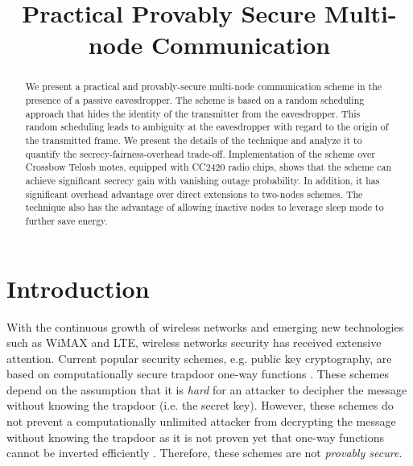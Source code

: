 \documentclass[10pt,letterpaper,conference]{IEEEtran}
\begin{document}
\title{Practical Provably Secure Multi-node Communication}

\author{
 \and
{}
 \and {}
}

\maketitle
\begin{abstract}
We present a practical and provably-secure multi-node communication scheme in
the presence of a passive eavesdropper. The scheme is based on a random
scheduling approach that hides the identity of the transmitter from the
eavesdropper. This random scheduling leads to ambiguity at the eavesdropper with
regard to the origin of the transmitted frame. We present the details of the
technique and analyze it to quantify the secrecy-fairness-overhead trade-off.
Implementation of the scheme over Crossbow Telosb motes, equipped with CC2420
radio chips, shows that the scheme can achieve significant secrecy gain with
vanishing outage probability. In addition, it has significant overhead advantage over direct extensions to two-nodes schemes. The
technique also has the advantage of allowing inactive nodes to leverage sleep
mode to further save energy.
\end{abstract}

\section{Introduction}
With the continuous growth of wireless networks and emerging new technologies
such as WiMAX and LTE, wireless networks security has received extensive
attention. Current popular security schemes, e.g. public key cryptography, are
based on computationally secure trapdoor one-way functions \cite{Faqs02}. These
schemes depend on the assumption that it is \textit{hard} for an attacker to
decipher the message without knowing the trapdoor (i.e. the secret key).
However, these schemes do not prevent a computationally unlimited attacker from
decrypting the message without knowing the trapdoor as it is not proven yet that
one-way functions cannot be inverted efficiently \cite{Faqs02}. Therefore, these
schemes are not \textit{provably secure}.
\end{document}
